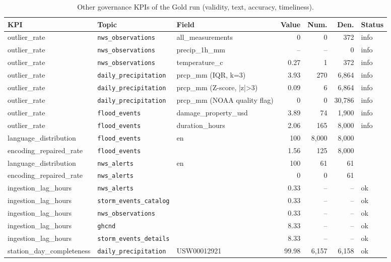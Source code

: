 \begin{table}[H]\centering\scriptsize
\caption{Other governance KPIs of the Gold run (validity, text, accuracy, timeliness).}\label{tab:govother}
\begin{tabular}{@{}lllrrrl@{}}\toprule
KPI & Topic & Field & Value & Num. & Den. & Status\\\midrule
outlier\_rate & \texttt{nws\_observations} & all\_measurements & 0 & 0 & 372 & info\\
outlier\_rate & \texttt{nws\_observations} & precip\_1h\_mm & -- & -- & 0 & info\\
outlier\_rate & \texttt{nws\_observations} & temperature\_c & 0.27 & 1 & 372 & info\\
outlier\_rate & \texttt{daily\_precipitation} & prcp\_mm (IQR, k=3) & 3.93 & 270 & 6,864 & info\\
outlier\_rate & \texttt{daily\_precipitation} & prcp\_mm (Z-score, |z|>3) & 0.09 & 6 & 6,864 & info\\
outlier\_rate & \texttt{daily\_precipitation} & prcp\_mm (NOAA quality flag) & 0 & 0 & 30,786 & info\\
outlier\_rate & \texttt{flood\_events} & damage\_property\_usd & 3.89 & 74 & 1,900 & info\\
outlier\_rate & \texttt{flood\_events} & duration\_hours & 2.06 & 165 & 8,000 & info\\
language\_distribution & \texttt{flood\_events} & en & 100 & 8,000 & 8,000 & \\
encoding\_repaired\_rate & \texttt{flood\_events} &  & 1.56 & 125 & 8,000 & \\
language\_distribution & \texttt{nws\_alerts} & en & 100 & 61 & 61 & \\
encoding\_repaired\_rate & \texttt{nws\_alerts} &  & 0 & 0 & 61 & \\
ingestion\_lag\_hours & \texttt{nws\_alerts} &  & 0.33 & -- & -- & ok\\
ingestion\_lag\_hours & \texttt{storm\_events\_catalog} &  & 0.33 & -- & -- & ok\\
ingestion\_lag\_hours & \texttt{nws\_observations} &  & 0.33 & -- & -- & ok\\
ingestion\_lag\_hours & \texttt{ghcnd} &  & 8.33 & -- & -- & ok\\
ingestion\_lag\_hours & \texttt{storm\_events\_details} &  & 8.33 & -- & -- & ok\\
station\_day\_completeness & \texttt{daily\_precipitation} & USW00012921 & 99.98 & 6,157 & 6,158 & ok\\

\end{tabular}
\end{table}
